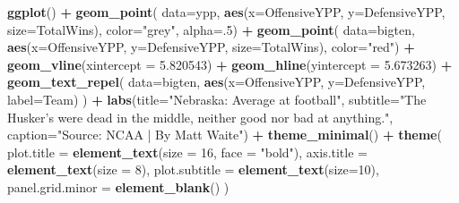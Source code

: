 \documentclass[
]{book}
\newenvironment{Shaded}{\begin{snugshade}}{\end{snugshade}}
\newcommand{\DataTypeTok}[1]{\textcolor[rgb]{0.13,0.29,0.53}{#1}}
\newcommand{\DecValTok}[1]{\textcolor[rgb]{0.00,0.00,0.81}{#1}}
\newcommand{\FloatTok}[1]{\textcolor[rgb]{0.00,0.00,0.81}{#1}}
\newcommand{\KeywordTok}[1]{\textcolor[rgb]{0.13,0.29,0.53}{\textbf{#1}}}
\newcommand{\NormalTok}[1]{#1}
\newcommand{\OperatorTok}[1]{\textcolor[rgb]{0.81,0.36,0.00}{\textbf{#1}}}
\newcommand{\StringTok}[1]{\textcolor[rgb]{0.31,0.60,0.02}{#1}}
\begin{document}
\begin{Shaded}
\begin{Highlighting}[]
\KeywordTok{ggplot}\NormalTok{() }\OperatorTok{+}\StringTok{ }
\StringTok{  }\KeywordTok{geom_point}\NormalTok{(}
    \DataTypeTok{data=}\NormalTok{ypp, }
    \KeywordTok{aes}\NormalTok{(}\DataTypeTok{x=}\NormalTok{OffensiveYPP, }\DataTypeTok{y=}\NormalTok{DefensiveYPP, }\DataTypeTok{size=}\NormalTok{TotalWins), }
    \DataTypeTok{color=}\StringTok{"grey"}\NormalTok{, }
    \DataTypeTok{alpha=}\NormalTok{.}\DecValTok{5}\NormalTok{) }\OperatorTok{+}\StringTok{ }
\StringTok{  }\KeywordTok{geom_point}\NormalTok{(}
    \DataTypeTok{data=}\NormalTok{bigten, }
    \KeywordTok{aes}\NormalTok{(}\DataTypeTok{x=}\NormalTok{OffensiveYPP, }\DataTypeTok{y=}\NormalTok{DefensiveYPP, }\DataTypeTok{size=}\NormalTok{TotalWins), }
    \DataTypeTok{color=}\StringTok{"red"}\NormalTok{) }\OperatorTok{+}\StringTok{ }
\StringTok{  }\KeywordTok{geom_vline}\NormalTok{(}\DataTypeTok{xintercept =} \FloatTok{5.820543}\NormalTok{) }\OperatorTok{+}\StringTok{ }
\StringTok{  }\KeywordTok{geom_hline}\NormalTok{(}\DataTypeTok{yintercept =} \FloatTok{5.673263}\NormalTok{) }\OperatorTok{+}\StringTok{ }
\StringTok{  }\KeywordTok{geom_text_repel}\NormalTok{(}
    \DataTypeTok{data=}\NormalTok{bigten, }
    \KeywordTok{aes}\NormalTok{(}\DataTypeTok{x=}\NormalTok{OffensiveYPP, }\DataTypeTok{y=}\NormalTok{DefensiveYPP, }\DataTypeTok{label=}\NormalTok{Team)}
\NormalTok{  ) }\OperatorTok{+}
\StringTok{  }\KeywordTok{labs}\NormalTok{(}\DataTypeTok{title=}\StringTok{"Nebraska: Average at football"}\NormalTok{, }\DataTypeTok{subtitle=}\StringTok{"The Husker's were dead in the middle, neither good nor bad at anything."}\NormalTok{, }\DataTypeTok{caption=}\StringTok{"Source: NCAA | By Matt Waite"}\NormalTok{)  }\OperatorTok{+}\StringTok{ }\KeywordTok{theme_minimal}\NormalTok{() }\OperatorTok{+}\StringTok{ }
\StringTok{  }\KeywordTok{theme}\NormalTok{(}
    \DataTypeTok{plot.title =} \KeywordTok{element_text}\NormalTok{(}\DataTypeTok{size =} \DecValTok{16}\NormalTok{, }\DataTypeTok{face =} \StringTok{"bold"}\NormalTok{),}
    \DataTypeTok{axis.title =} \KeywordTok{element_text}\NormalTok{(}\DataTypeTok{size =} \DecValTok{8}\NormalTok{), }
    \DataTypeTok{plot.subtitle =} \KeywordTok{element_text}\NormalTok{(}\DataTypeTok{size=}\DecValTok{10}\NormalTok{), }
    \DataTypeTok{panel.grid.minor =} \KeywordTok{element_blank}\NormalTok{()}
\NormalTok{    )}
\end{Highlighting}
\end{Shaded}
\end{document}
